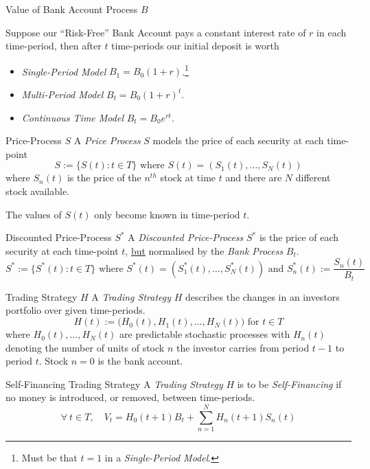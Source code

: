 \documentclass[11pt,a4paper]{article}
\begin{document}
  \begin{proposition}{Value of Bank Account Process $B$}
    \par Suppose our ``Risk-Free'' Bank Account pays a constant interest rate of $r$ in each time-period, then after $t$ time-periods our initial deposit is worth
    \begin{itemize}
      \item \textit{Single-Period Model} $B_1=B_0(1+r)$.\footnote{Must be that $t=1$ in a \textit{Single-Period Model}.}
      \item \textit{Multi-Period Model} $B_t=B_0(1+r)^t$.
      \item \textit{Continuous Time Model} $B_t=B_0e^{rt}$.
    \end{itemize}
  \end{proposition}

  \begin{definition}{Price-Process $S$}\label{def_price_process}
    A \textit{Price Process} $S$ models the price of each security at each time-point
    \[ S:=\{S(t):t\in T\}\text{ where }S(t)=(S_1(t),\dots,S_N(t)) \]
    where $S_n(t)$ is the price of the $n^{th}$ stock at time $t$ and there are $N$ different stock available.
    \par The values of $S(t)$ only become known in time-period $t$.
  \end{definition}

  \begin{definition}{Discounted Price-Process $S^*$}\label{def_discounted_price_process}
    A \textit{Discounted Price-Process} $S^*$ is the price of each security at each time-point $t$, \underline{but} normalised by the \textit{Bank Process} $B_t$.
    \[ S^*:=\{S^*(t):t\in T\}\text{ where }S^*(t)=(S_1^*(t),\dots,S_N^*(t))\text{ and }S_n^*(t):=\frac{S_n(t)}{B_t} \]
  \end{definition}

  \begin{definition}{Trading Strategy $H$}
    A \textit{Trading Strategy} $H$ describes the changes in an investors portfolio over given time-periods.
    \[ H(t):=\big(H_0(t),H_1(t),\dots,H_N(t)\big)\text{ for }t\in T \]
    where $H_0(t),\dots,H_N(t)$ are predictable stochastic processes with $H_n(t)$ denoting the number of units of stock $n$ the investor carries from period $t-1$ to period $t$. Stock $n=0$ is the bank account.
  \end{definition}

  \begin{definition}{Self-Financing Trading Strategy}
    A \textit{Trading Strategy} $H$ is to be \textit{Self-Financing} if no money is introduced, or removed, between time-periods.
    \[ \forall\ t\in T,\quad V_t=H_0(t+1)B_t+\sum_{n=1}^NH_n(t+1)S_n(t) \]
  \end{definition}
\end{document}
